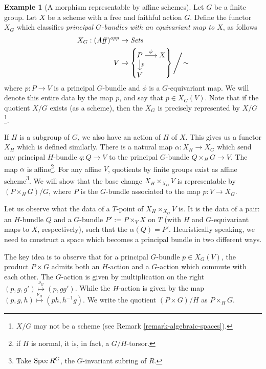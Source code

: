 \documentclass[11pt]{amsart}
\newcommand{\Spec}{{\rm Spec \,}}
\theoremstyle{definition}
\newtheorem{example}[theorem]{Example}
\begin{document}
\begin{example}[A morphism representable by affine schemes]
	\label{example-G-H-bundles}
	Let $G$ be a finite group. Let $X$ be a scheme with a free and faithful action $G$. Define the functor $X_G$ which classifies \textit{principal $G$-bundles with an equivariant map to $X$}, as follows
	\begin{align*}
	X_G: (\mathit{Aff})^{opp} & \rightarrow \mathit{Sets}\\
	V & \mapsto \left\{
	\begin{tikzcd}[cramped, row sep =3.5ex, column sep=4ex ,ampersand replacement=\&]
	P\arrow[r,"\phi"]\arrow[d,"p"] \& X\\
	V
	\end{tikzcd}\right\} \Bigg/\!\sim
	\end{align*}
	where $p: P\rightarrow V$ is a principal $G$-bundle and $\phi$ is a $G$-equivariant map. We will denote this entire data by the map $p$, and say that $p\in X_G(V)$. Note that if the quotient $X/G$ exists (as a scheme), then the $X_G$ is precisely represented by $X/G$\footnote{$X/G$ may not be a scheme (see Remark \ref{remark-algebraic-spaces}).}.
	
	If $H$ is a subgroup of $G$, we also have an action of $H$ of $X$. This gives us a functor $X_H$ which is defined similarly. There is a natural map $\alpha: X_H\rightarrow X_G$ which send any principal $H$-bundle $q: Q\rightarrow V$ to the principal $G$-bundle $Q\times_H G\rightarrow V $. The map $\alpha$ is affine\footnote{if $H$ is normal, it is, in fact, a $G/H$-torsor.}. For any affine $V$, quotients by finite groups exist as affine scheme\footnote{Take $\Spec R^G$, the $G$-invariant subring of $R$.}. We will show that the base change $X_H\times_{X_G} V$ is representable by $(P\times_H G)/G$, where $P$ is the $G$-bundle associated to the map $p:V\rightarrow X_G$.
	
	Let us observe what the data of a $T$-point of $X_H\times_{X_G} V$ is. It is the data of a pair: an $H$-bundle $Q$ and a $G$-bundle $P':=P\times_V X$ on $T$ (with $H$ and $G$-equivariant maps to $X$, respectively), such that the $\alpha(Q)=P'$. Heuristically speaking, we need to construct a space which becomes a principal bundle in two different ways.
	
	The key idea is to observe that for a principal $G$-bundle $p\in X_G(V)$, the product $P\times G$ admits both an $H$-action and a $G$-action which commute with each other. The $G$-action is given by multiplication on the right $(p,g,g')\overset{\nu_G}{\mapsto} (p,gg')$. While the $H$-action is given by the map $(p,g,h)\overset{\nu_H}{\mapsto} (ph,h^{-1}g)$. We write the quotient $(P\times G)/H$ as $P\times_H G$.
	

\end{example}
\end{document}
